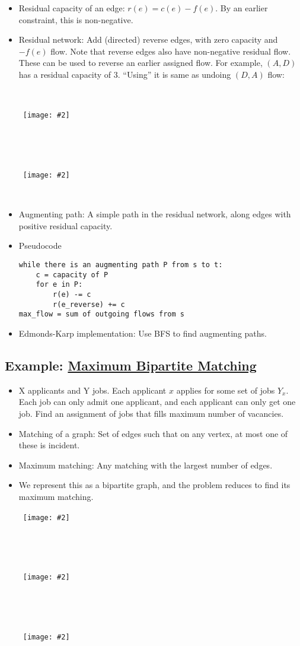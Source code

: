 \documentclass{article}
\newcommand{\image}[2]{\
    \begin{center}\
        \texttt{[image: \#2]}\
    \end{center}\
}
\begin{document}
\begin{sloppypar}
    \begin{itemize}
        \item Residual capacity of an edge: $r(e) = c(e) - f(e)$. By an earlier constraint, this is non-negative.
        \item Residual network: Add (directed) reverse edges, with zero capacity and $-f(e)$ flow. Note that reverse edges also have non-negative residual flow. These can be used to reverse an earlier assigned flow. For example, $(A,D)$ has a residual capacity of 3. ``Using'' it is same as undoing $(D,A)$ flow:\\
        \begin{minipage}{.45\textwidth}
            \image{1.0}{../images/Flow7.png}
        \end{minipage}
        \begin{minipage}{.45\textwidth}
            \image{1.0}{../images/Flow8.png}
        \end{minipage}
        \item Augmenting path: A simple path in the residual network, along edges with positive residual capacity.
        \item Pseudocode
\begin{lstlisting}[]
while there is an augmenting path P from s to t:
    c = capacity of P
    for e in P:
        r(e) -= c
        r(e_reverse) += c
max_flow = sum of outgoing flows from s
\end{lstlisting}
        \item Edmonds-Karp implementation: Use BFS to find augmenting paths.
    \end{itemize}

    \subsection{Example: \href{https://www.geeksforgeeks.org/maximum-bipartite-matching/}{Maximum Bipartite Matching}}
    \begin{itemize}
        \item X applicants and Y jobs. Each applicant $x$ applies for some set of jobs $Y_x$. Each job can only admit one applicant, and each applicant can only get one job. Find an assignment of jobs that fills maximum number of vacancies.
        \item Matching of a graph: Set of edges such that on any vertex, at most one of these is incident.
        \item Maximum matching: Any matching with the largest number of edges.
        \item We represent this as a bipartite graph, and the problem reduces to find its maximum matching.
        \image{0.6}{../images/maximum_matching1.png}
        \begin{minipage}{.45\textwidth}
            \image{1.0}{../images/maximum_matching2.png}
        \end{minipage}
        \begin{minipage}{.45\textwidth}
            \image{1.0}{../images/maximum_matching21.png}
        \end{minipage}
    \end{itemize}


\end{sloppypar}
\end{document}
